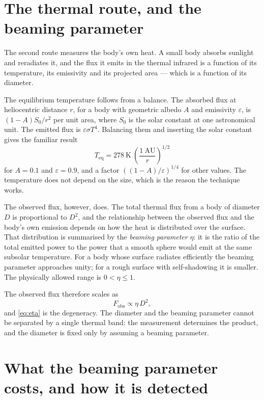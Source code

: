 \section{The thermal route, and the beaming parameter}

The second route measures the body's own heat. A small body absorbs sunlight
and reradiates it, and the flux it emits in the thermal infrared is a
function of its temperature, its emissivity and its projected area --- which
is a function of its diameter.

The equilibrium temperature follows from a balance. The absorbed flux at
heliocentric distance \(r\), for a body with geometric albedo \(A\) and
emissivity \(\varepsilon\), is \((1-A)S_0/r^{2}\) per unit area, where \(S_0\)
is the solar constant at one astronomical unit. The emitted flux is
\(\varepsilon\sigma T^{4}\). Balancing them and inserting the solar constant
gives the familiar result
\begin{equation}
T_{\mathrm{eq}} = 278\ \mathrm{K}\ \left(\frac{1\ \mathrm{AU}}{r}\right)^{1/2}
\label{eq:teq}
\end{equation}
for \(A = 0.1\) and \(\varepsilon = 0.9\), and a factor \(((1-A)/\varepsilon)^{1/4}\)
for other values. The temperature does not depend on the size, which is the
reason the technique works.

The observed flux, however, does. The total thermal flux from a body of
diameter \(D\) is proportional to \(D^{2}\), and the relationship between the
observed flux and the body's own emission depends on how the heat is
distributed over the surface. That distribution is summarised by the
\emph{beaming parameter} \(\eta\): it is the ratio of the total emitted power
to the power that a smooth sphere would emit at the same subsolar
temperature. For a body whose surface radiates efficiently the beaming
parameter approaches unity; for a rough surface with self-shadowing it is
smaller. The physically allowed range is \(0 < \eta \leq 1\).

The observed flux therefore scales as
\begin{equation}
F_{\mathrm{obs}} \propto \eta\,D^{2},
\label{eq:eta}
\end{equation}
and \eqref{eq:eta} is the degeneracy. The diameter and the beaming parameter
cannot be separated by a single thermal band: the measurement determines the
product, and the diameter is fixed only by assuming a beaming parameter.

\section{What the beaming parameter costs, and how it is detected}

